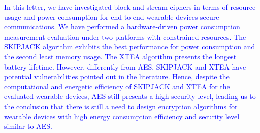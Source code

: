\documentclass[journal]{IEEEtran}
\newcommand{\rever}{\textcolor{blue}}
\begin{document}
\rever{In this letter, we have investigated %
block and stream ciphers in terms of resource usage and power consumption for end-to-end wearable devices secure communications. %
We have performed a hardware-driven power consumption measurement evaluation under two platforms with constrained resources. The SKIPJACK algorithm exhibits the best performance %
for power consumption %
and the second least memory usage. %
The XTEA algorithm presents the longest battery lifetime. However, differently from AES, SKIPJACK and XTEA have potential vulnerabilities pointed out in the literature. Hence, despite the computational and energetic efficiency of SKIPJACK and XTEA for the evaluated wearable devices, AES still presents a high security level, leading us to the conclusion that there is still a need to design encryption algorithms for wearable devices with high energy consumption efficiency and security level similar to AES.    %
}

\vspace{-0.2cm}


\vspace{-0.3cm}
\end{document}
